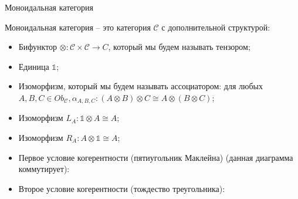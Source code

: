 \begin{defin} Моноидальная категория

  Моноидальная категория -- это категория $\mathcal{C}$ с дополнительной структурой:
  \begin{itemize}
    \item Бифунктор $\otimes : \mathcal{C} \times \mathcal{C} \to C$, который мы будем называть тензором;
    \item Единица $\mathds{1}$;
    \item Изоморфизм, который мы будем называть ассоциатором: для любых $A, B, C \in Ob_{\mathcal{C}}, \alpha_{A,B,C}: (A \otimes B) \otimes C \cong A \otimes (B \otimes C)$;
    \item Изоморфизм  $L_A : \mathds{1} \otimes A \cong A$;
    \item Изоморфизм $R_A : A \otimes \mathds{1} \cong A$;
    \item Первое условие когерентности (пятиугольник Маклейна) (данная диаграмма коммутирует):

    \item Второе условие когерентности (тождество треугольника):

  \end{itemize}
\end{defin}

